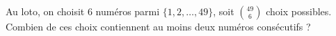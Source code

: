Au loto, on choisit $6$ numéros parmi $\{1, 2, \ldots, 49\}$, soit $\binom{49}{6}$ choix possibles. Combien de ces choix contiennent au moins deux numéros consécutifs ?
